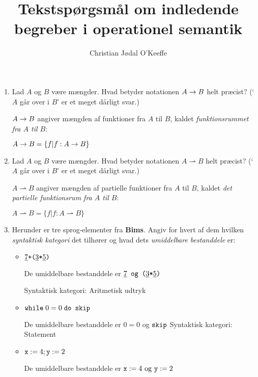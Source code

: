 \documentclass[a4paper,10pt]{article}
\title{Tekstspørgsmål om indledende begreber i operationel semantik}
\author{Christian Jødal O'Keeffe}
\date{} %
\begin{document}
\maketitle

\begin{enumerate}
\item Lad $A$ og $B$ være mængder. Hvad betyder notationen $A
  \rightarrow B$ helt præcist? (`$A$ går over i $B$' er et meget dårligt svar.)
\begin{svar}
$A \rightarrow B$ angiver mængden af funktioner fra $A$ til $B$, kaldet \textit{funktionsrummet fra $A$ til $B$}:

$A \rightarrow B = \{f|f:A \rightarrow B\}$
\end{svar}
\item Lad $A$ og $B$ være mængder. Hvad betyder notationen $A
  \rightharpoonup B$ helt præcist?  (`$A$ går over i $B$' er et meget dårligt svar.)
\begin{svar}
$A \rightharpoonup B$ angiver mængden af partielle funktioner fra $A$ til $B$, kaldet \textit{det partielle funktionsrum fra $A$ til $B$}:

$A \rightharpoonup B = \{f|f:A \rightharpoonup B\}$
\end{svar}
\item Herunder er tre sprog-elementer fra \textbf{Bims}. Angiv for
  hvert af dem hvilken \emph{syntaktisk kategori} det tilhører og
  hvad dets \emph{umiddelbare bestanddele} er:
\begin{itemize}
\item $\underline{7} \mbox{\tt +($\underline{3}$*$\underline{5}$)}$
\begin{svar}
De umiddelbare bestanddele er $\underline{7} \mbox{\tt \text{ og} ($\underline{3}$*$\underline{5}$)}$

Syntaktisk kategori: Aritmetisk udtryk
\end{svar}
\item $\mbox{\tt while}\; 0=0\; \mbox{\tt do skip}$
\begin{svar}
De umiddelbare bestanddele er $0=0$ og $\mbox{\tt skip}$
Syntaktisk kategori: Statement
\end{svar}
\item $\mbox{\tt x}:=4;\mbox{\tt y}:=2$
\begin{svar}
De umiddelbare bestanddele er $\mbox{\tt x}:=4\text{ og } \mbox{\tt y}:=2$


\end{svar}
\end{itemize}
\end{enumerate}
\end{document}
